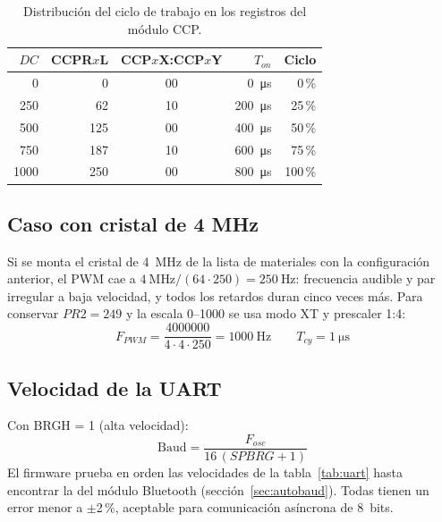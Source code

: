\begin{table}[H]
  \centering
  \caption{Distribución del ciclo de trabajo en los registros del módulo CCP.}
  \label{tab:duty}
  \begin{tabular}{@{}r r c r r@{}}
    \toprule
    \textbf{$DC$} & \textbf{CCPR$x$L} & \textbf{CCP$x$X:CCP$x$Y} & \textbf{$T_{on}$} & \textbf{Ciclo} \\
    \midrule
    0    & 0   & 00 & \SI{0}{\micro\second}   & 0\,\%   \\
    250  & 62  & 10 & \SI{200}{\micro\second} & 25\,\%  \\
    500  & 125 & 00 & \SI{400}{\micro\second} & 50\,\%  \\
    750  & 187 & 10 & \SI{600}{\micro\second} & 75\,\%  \\
    1000 & 250 & 00 & \SI{800}{\micro\second} & 100\,\% \\
    \bottomrule
  \end{tabular}
\end{table}

\subsection{Caso con cristal de 4 MHz}

Si se monta el cristal de \SI{4}{\mega\hertz} de la lista de materiales con la
configuración anterior, el PWM cae a
$\SI{4}{\mega\hertz} / (64 \cdot 250) = \SI{250}{\hertz}$: frecuencia audible y
par irregular a baja velocidad, y todos los retardos duran cinco veces más.
Para conservar $PR2 = 249$ y la escala 0--1000 se usa modo XT y prescaler 1:4:
\begin{equation}
  F_{PWM} = \frac{\num{4000000}}{4\cdot 4\cdot 250} = \SI{1000}{\hertz}
  \qquad
  T_{cy} = \SI{1}{\micro\second}
\end{equation}

\subsection{Velocidad de la UART}

Con BRGH = 1 (alta velocidad):
\begin{equation}
  \text{Baud} = \frac{F_{osc}}{16\,(SPBRG + 1)}
\end{equation}
El firmware prueba en orden las velocidades de la tabla~\ref{tab:uart} hasta
encontrar la del módulo Bluetooth (sección~\ref{sec:autobaud}). Todas tienen un
error menor a $\pm$2\,\%, aceptable para comunicación asíncrona de 8~bits.

